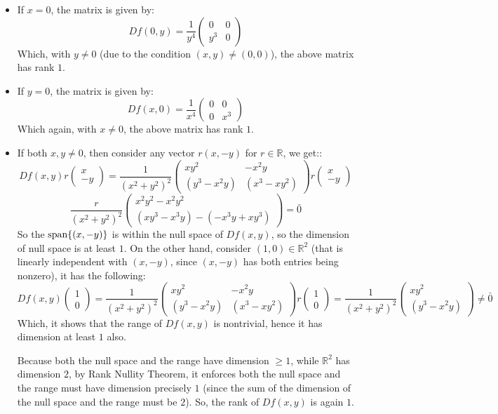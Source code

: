 \documentclass{article}
\begin{document}
\begin{itemize}
    \item If $x=0$, the matrix is given by:
    $$Df(0,y) = \frac{1}{y^4}\begin{pmatrix}
        0&0\\ y^3 & 0
    \end{pmatrix}$$
    Which, with $y\neq 0$ (due to the condition $(x,y)\neq (0,0)$), the above matrix has rank $1$.
    \item If $y=0$, the matrix is given by:
    $$Df(x,0)=\frac{1}{x^4}\begin{pmatrix}
        0&0\\0& x^3
    \end{pmatrix}$$
    Which again, with $x\neq 0$, the above matrix has rank $1$.
    \item If both $x,y\neq 0$, then consider any vector $r(x,-y)$ for $r\in\mathbb{R}$, we get::
    $$Df(x,y)r\begin{pmatrix}x\\-y\end{pmatrix} =\frac{1}{(x^2+y^2)^2}\begin{pmatrix}
        xy^2&-x^2y\\
        (y^3-x^2y) & (x^3-xy^2)
    \end{pmatrix}r\begin{pmatrix}x\\-y\end{pmatrix}$$
    $$\frac{r}{(x^2+y^2)^2}\begin{pmatrix}
        x^2y^2 - x^2y^2\\
        (xy^3-x^3y)-(-x^3y+xy^3)
    \end{pmatrix} = \bar{0}$$
    So the $\textmd{span}\{(x,-y)\}$ is within the null space of $Df(x,y)$, so the dimension of null space is at least $1$. On the other hand, consider $(1,0)\in\mathbb{R}^2$ (that is linearly independent with $(x,-y)$, since $(x,-y)$ has both entries being nonzero), it has the following:
    $$Df(x,y)\begin{pmatrix}1\\0\end{pmatrix} = \frac{1}{(x^2+y^2)^2}\begin{pmatrix}
        xy^2&-x^2y\\
        (y^3-x^2y) & (x^3-xy^2)
    \end{pmatrix}r\begin{pmatrix}1\\0\end{pmatrix} = \frac{1}{(x^2+y^2)^2}\begin{pmatrix}
        xy^2\\(y^3-x^2y)
    \end{pmatrix} \neq \bar{0}$$
    Which, it shows that the range of $Df(x,y)$ is nontrivial, hence it has dimension at least $1$ also.

    Because both the null space and the range have dimension $\geq 1$, while $\mathbb{R}^2$ has dimension $2$, by Rank Nullity Theorem, it enforces both the null space and the range must have dimension precisely $1$ (since the sum of the dimension of the null space and the range must be $2$).
    So, the rank of $Df(x,y)$ is again $1$.
\end{itemize}
\end{document}
